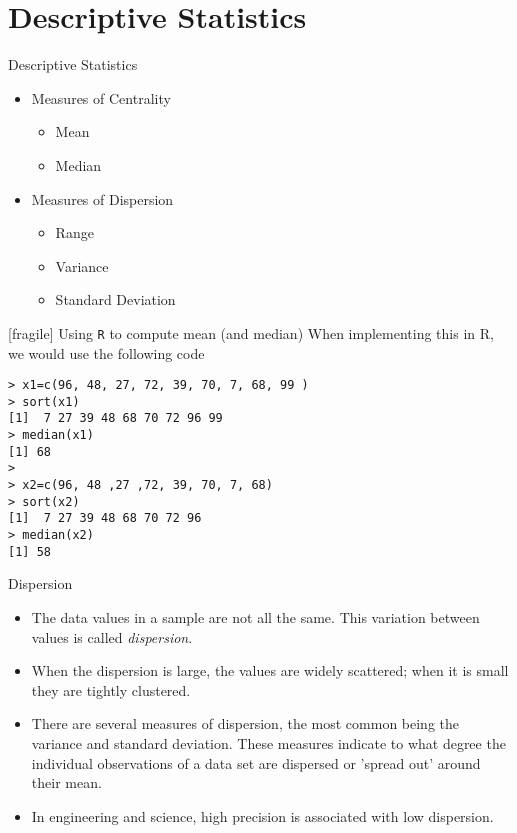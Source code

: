 ﻿%

\section{Descriptive Statistics}

{

	{Descriptive Statistics}

\begin{itemize}
\item Measures of Centrality
\begin{itemize}
\item Mean
\item Median
\end{itemize}
\item Measures of Dispersion
\begin{itemize}
\item Range
\item Variance
\item Standard Deviation
\end{itemize}
\end{itemize}

}




[fragile]
	{Using \texttt{R} to compute mean (and median)}
When implementing this in R, we would use the following code

\begin{verbatim}
> x1=c(96, 48, 27, 72, 39, 70, 7, 68, 99 )
> sort(x1)
[1]  7 27 39 48 68 70 72 96 99
> median(x1)
[1] 68
>
> x2=c(96, 48 ,27 ,72, 39, 70, 7, 68)
> sort(x2)
[1]  7 27 39 48 68 70 72 96
> median(x2)
[1] 58
\end{verbatim}


{
	{Dispersion }

\begin{itemize}
\item The data values in a sample are not all the same. This variation between values is called \t{ \emph{dispersion}}.

\item When the dispersion is large, the values are widely scattered; when it is small they are tightly clustered.


\item
There are several measures of dispersion, the most common being the variance and  standard deviation. These measures indicate to what degree the individual observations of a data set are dispersed or 'spread out' around their mean.

\item
In engineering and science, high precision is associated with low dispersion.
\end{itemize}
}



